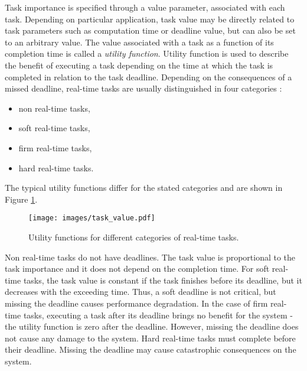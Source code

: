 Task importance is specified through a value parameter, associated with each task.
Depending on particular application, task value may be directly related to task parameters such as computation time or deadline value, but can also be set to an arbitrary value. 
The value associated with a task as a function of its completion time is called a \textit{utility function}.
Utility function is used to describe the benefit of executing a task depending on the time at which the task is completed in relation to the task deadline.
Depending on the consequences of a missed deadline, real-time tasks are usually distinguished in four categories \cite{buttazzo2011hard}:
\begin{itemize}
    \item non real-time tasks,
    \item soft real-time tasks,
    \item firm real-time tasks,
    \item hard real-time tasks.
\end{itemize}
The typical utility functions differ for the stated categories and are shown in Figure \ref{utility}.
\begin{figure}[ht]
    \centering
    \texttt{[image: images/task\_value.pdf]}
    \caption{Utility functions for different categories of real-time tasks.}
    \label{utility}
\end{figure}
Non real-time tasks do not have deadlines. The task value is proportional to the task importance and it does not depend on the completion time.
For soft real-time tasks, the task value is constant if the task finishes before its deadline, but it decreases with the exceeding time. 
Thus, a soft deadline is not critical, but missing the deadline causes performance degradation.
In the case of firm real-time tasks, executing a task after its deadline brings no benefit for the system - the utility function is zero after the deadline. However, missing the deadline does not cause any damage to the system.
Hard real-time tasks must complete before their deadline. Missing the deadline may cause catastrophic consequences on the system.

